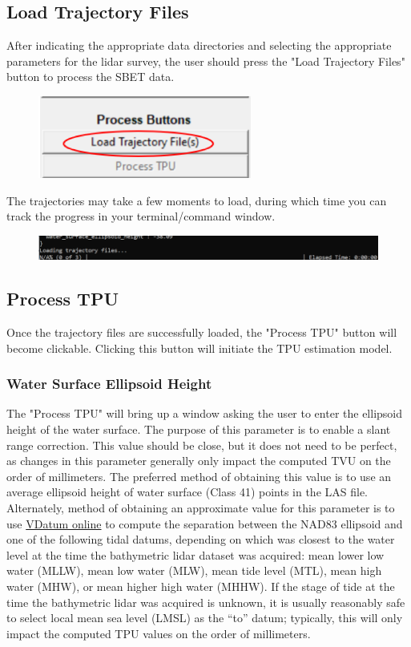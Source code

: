 \documentclass[11pt, a4paper]{article}
\begin{document}
\subsection{Load Trajectory Files}
After indicating the appropriate data directories and selecting the appropriate parameters for the lidar survey, the user should press the "Load Trajectory Files" button to process the SBET data.

\begin{figure}[H]
    \centering
    \includegraphics[width=7cm]{figs/loadtraj.png}
\end{figure}

The trajectories may take a few moments to load, during which time you can track the progress in your terminal/command window.

\begin{figure}[H]
    \centering
    \includegraphics[width=15cm]{figs/term_loadtraj.png}
\end{figure}

\subsection{Process TPU}
Once the trajectory files are successfully loaded, the "Process TPU" button will become clickable. Clicking this button will initiate the TPU estimation model.

\subsubsection{Water Surface Ellipsoid Height}
The "Process TPU" will bring up a window asking the user to enter the ellipsoid height of the water surface. The purpose of this parameter is to enable a slant range correction. This value should be close, but it does not need to be perfect, as changes in this parameter generally only impact the computed TVU on the order of millimeters. The preferred method of obtaining this value is to use an average ellipsoid height of water surface (Class 41) points in the LAS file. Alternately, method of obtaining an approximate value for this parameter is to use \href{https://vdatum.noaa.gov/vdatumweb/}{VDatum online} to compute the separation between the NAD83 ellipsoid and one of the following tidal datums, depending on which was closest to the water level at the time the bathymetric lidar dataset was acquired: mean lower low water (MLLW), mean low water (MLW), mean tide level (MTL), mean high water (MHW), or mean higher high water (MHHW). If the stage of tide at the time the bathymetric lidar was acquired is unknown, it is usually reasonably safe to select local mean sea level (LMSL) as the “to” datum; typically, this will only impact the computed TPU values on the order of millimeters.
\end{document}
